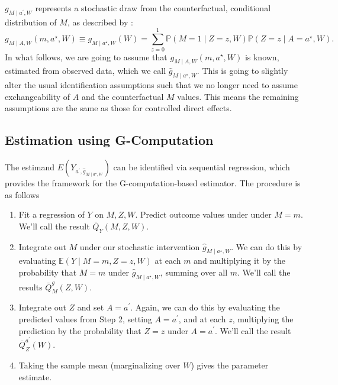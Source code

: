 \documentclass[
  12pt, krantz2,
]{book}
\providecommand{\tightlist}{%
  \setlength{\itemsep}{0pt}\setlength{\parskip}{0pt}}
\theoremstyle{definition}
\theoremstyle{definition}
\theoremstyle{definition}
\renewcommand{\P}{\mathbb{P}}
\newcommand{\E}{\mathbb{E}}
\newcommand{\1}{\mathbbm{1}}
\begin{document}
\(g_{M \mid a^\prime,W}\) represents a stochastic draw from the counterfactual,
conditional distribution of \(M\), as described by
\citet{vanderweele2016mediation}:
\begin{equation*}
  g_{M \mid A,W}(m, a^{\star}, W) \equiv g_{M \mid a^{\star}, W}(W) =
    \sum_{z=0}^1 \P(M=1 \mid Z=z,W) \P(Z=z \mid A=a^{\star}, W).
\end{equation*}
In what follows, we are going to assume that \(g_{M \mid A,W}(m, a^{\star}, W)\)
is known, estimated from observed data, which we call
\(\hat{g}_{M \mid a^{\star}, W}\). This is going to slightly alter the usual
identification assumptions such that we no longer need to assume exchangeability
of \(A\) and the counterfactual \(M\) values. This means the remaining assumptions
are the same as those for controlled direct effects.

\hypertarget{estimation-using-g-computation}{%
\subsection{Estimation using G-Computation}\label{estimation-using-g-computation}}

The estimand \(E(Y_{a^\prime, \hat{g}_{M \mid a^\star,W}})\) can be identified
via sequential regression, which provides the framework for the
G-computation-based estimator. The procedure is as follows

\begin{enumerate}
\def\labelenumi{\arabic{enumi}.}
\tightlist
\item
  Fit a regression of \(Y\) on \(M,Z,W\). Predict outcome values under under
  \(M=m\). We'll call the result \(\bar{Q}_Y(M,Z,W)\).
\item
  Integrate out \(M\) under our stochastic intervention
  \(\hat{g}_{M \mid a^{\star}, W}\). We can do this by evaluating
  \(\E(Y \mid M=m,Z=z,W)\) at each \(m\) and multiplying it by the probability
  that \(M=m\) under \(\hat{g}_{M \mid a^{\star}, W}\), summing over all \(m\).
  We'll call the results \(\bar{Q}^{g}_M(Z,W)\).
\item
  Integrate out \(Z\) and set \(A=a^\prime\). Again, we can do this by evaluating
  the predicted values from Step 2, setting \(A=a^\prime\), and at each \(z\),
  multiplying the prediction by the probability that \(Z=z\) under \(A=a^\prime\).
  We'll call the result \(\bar{Q}^{a^\prime}_Z(W)\).
\item
  Taking the sample mean (marginalizing over \(W\)) gives the parameter
  estimate.
\end{enumerate}
\end{document}
